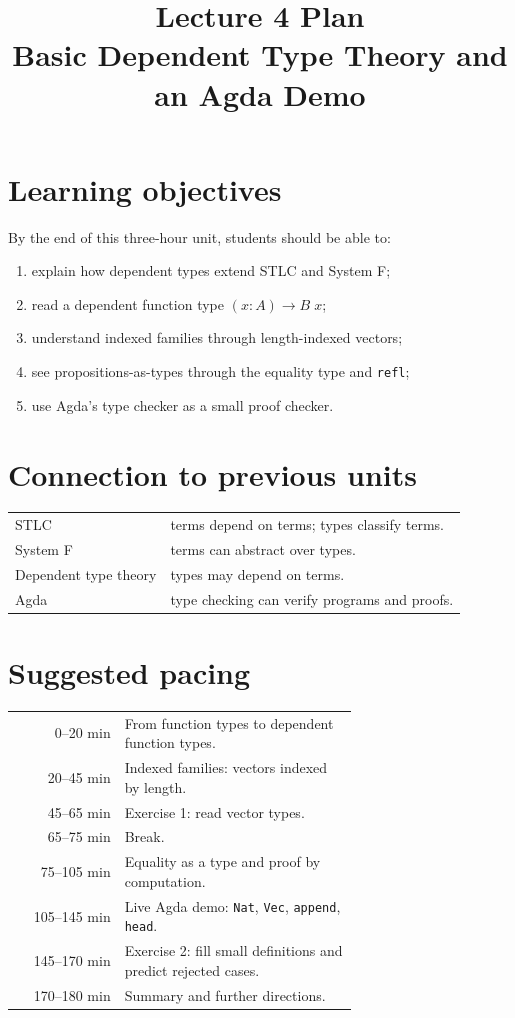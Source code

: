 \documentclass[11pt]{article}
\title{Lecture 4 Plan\\Basic Dependent Type Theory and an Agda Demo}
\author{}
\date{}
\begin{document}
\maketitle

\section*{Learning objectives}
By the end of this three-hour unit, students should be able to:
\begin{enumerate}[nosep]
  \item explain how dependent types extend STLC and System F;
  \item read a dependent function type $(x : A) \to B\;x$;
  \item understand indexed families through length-indexed vectors;
  \item see propositions-as-types through the equality type and \texttt{refl};
  \item use Agda's type checker as a small proof checker.
\end{enumerate}

\section*{Connection to previous units}
\begin{center}
\begin{tabular}{l l}
STLC & terms depend on terms; types classify terms.\\
System F & terms can abstract over types.\\
Dependent type theory & types may depend on terms.\\
Agda & type checking can verify programs and proofs.\\
\end{tabular}
\end{center}

\section*{Suggested pacing}
\begin{center}
\begin{tabular}{r p{0.68\linewidth}}
0--20 min & From function types to dependent function types.\\
20--45 min & Indexed families: vectors indexed by length.\\
45--65 min & Exercise 1: read vector types.\\
65--75 min & Break.\\
75--105 min & Equality as a type and proof by computation.\\
105--145 min & Live Agda demo: \texttt{Nat}, \texttt{Vec}, \texttt{append}, \texttt{head}.\\
145--170 min & Exercise 2: fill small definitions and predict rejected cases.\\
170--180 min & Summary and further directions.\\
\end{tabular}
\end{center}
\end{document}
